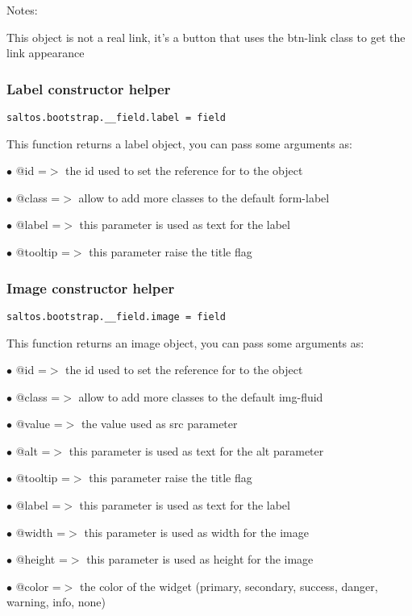 \documentclass[a4paper]{article}
\begin{document}
Notes:

This object is not a real link, it's a button that uses the btn-link class to get the link
appearance

\hypertarget{toc629}{}
\subsubsection{Label constructor helper}

\begin{lstlisting}
saltos.bootstrap.__field.label = field
\end{lstlisting}

This function returns a label object, you can pass some arguments as:

\begin{compactitem}
\item[\color{myblue}$\bullet$] @id      =$>$ the id used to set the reference for to the object
\item[\color{myblue}$\bullet$] @class   =$>$ allow to add more classes to the default form-label
\item[\color{myblue}$\bullet$] @label   =$>$ this parameter is used as text for the label
\item[\color{myblue}$\bullet$] @tooltip =$>$ this parameter raise the title flag
\end{compactitem}

\hypertarget{toc630}{}
\subsubsection{Image constructor helper}

\begin{lstlisting}
saltos.bootstrap.__field.image = field
\end{lstlisting}

This function returns an image object, you can pass some arguments as:

\begin{compactitem}
\item[\color{myblue}$\bullet$] @id      =$>$ the id used to set the reference for to the object
\item[\color{myblue}$\bullet$] @class   =$>$ allow to add more classes to the default img-fluid
\item[\color{myblue}$\bullet$] @value   =$>$ the value used as src parameter
\item[\color{myblue}$\bullet$] @alt     =$>$ this parameter is used as text for the alt parameter
\item[\color{myblue}$\bullet$] @tooltip =$>$ this parameter raise the title flag
\item[\color{myblue}$\bullet$] @label   =$>$ this parameter is used as text for the label
\item[\color{myblue}$\bullet$] @width   =$>$ this parameter is used as width for the image
\item[\color{myblue}$\bullet$] @height  =$>$ this parameter is used as height for the image
\item[\color{myblue}$\bullet$] @color   =$>$ the color of the widget (primary, secondary, success, danger, warning, info, none)
\end{compactitem}
\end{document}
